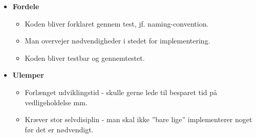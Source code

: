 \begin{itemize}
	
	\item \textbf{Fordele}	
	\begin{itemize}
		\item Koden bliver forklaret gennem test, jf. naming-convention.
		\item Man overvejer nødvendigheder i stedet for implementering.
		\item Koden bliver testbar og gennemtestet.
	\end{itemize}
	
	\item \textbf{Ulemper}	
	\begin{itemize}
		\item Forlænget udviklingstid - skulle gerne lede til besparet tid på vedligeholdelse mm.
		\item Kræver stor selvdisiplin - man skal ikke ''bare lige'' implementerer noget før det er nødvendigt.
	\end{itemize}
		
\end{itemize}
































